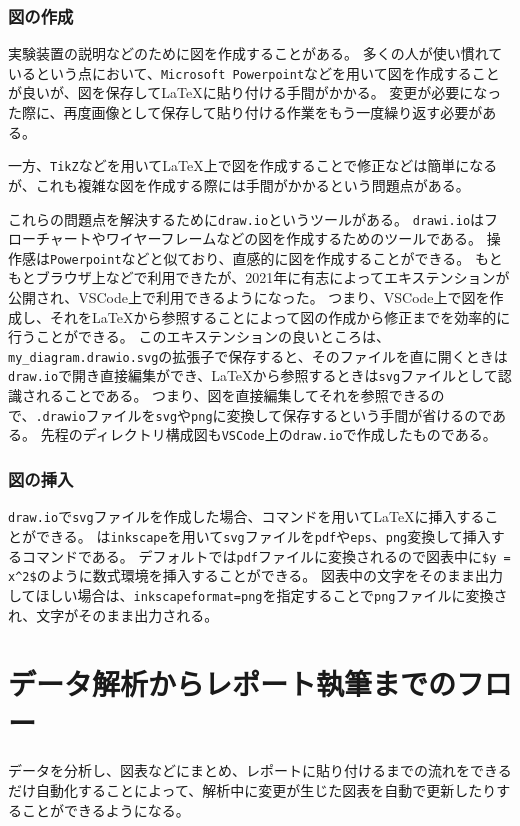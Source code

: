 \subsubsection{図の作成}

実験装置の説明などのために図を作成することがある。
多くの人が使い慣れているという点において、\verb|Microsoft Powerpoint|などを用いて図を作成することが良いが、図を保存して\LaTeX に貼り付ける手間がかかる。
変更が必要になった際に、再度画像として保存して貼り付ける作業をもう一度繰り返す必要がある。

一方、\verb|TikZ|などを用いて\LaTeX 上で図を作成することで修正などは簡単になるが、これも複雑な図を作成する際には手間がかかるという問題点がある。

これらの問題点を解決するために\verb|draw.io|というツールがある。
\verb|drawi.io|はフローチャートやワイヤーフレームなどの図を作成するためのツールである。
操作感は\verb|Powerpoint|などと似ており、直感的に図を作成することができる。
もともとブラウザ上などで利用できたが、2021年に有志によってエキステンションが公開され、VSCode上で利用できるようになった。
つまり、VSCode上で図を作成し、それを\LaTeX から参照することによって図の作成から修正までを効率的に行うことができる。
このエキステンションの良いところは、\verb|my_diagram.drawio.svg|の拡張子で保存すると、そのファイルを直に開くときは\verb|draw.io|で開き直接編集ができ、\LaTeX から参照するときは\verb|svg|ファイルとして認識されることである。
つまり、図を直接編集してそれを参照できるので、\verb|.drawio|ファイルを\verb|svg|や\verb|png|に変換して保存するという手間が省けるのである。
先程のディレクトリ構成図も\verb|VSCode|上の\verb|draw.io|で作成したものである。

\subsubsection{図の挿入}

\verb|draw.io|で\verb|svg|ファイルを作成した場合、\verb||コマンドを用いて\LaTeX に挿入することができる。
\verb||は\verb|inkscape|を用いて\verb|svg|ファイルを\verb|pdf|や\verb|eps|、\verb|png|変換して挿入するコマンドである。
デフォルトでは\verb|pdf|ファイルに変換されるので図表中に\verb|$y = x^2$|のように数式環境を挿入することができる。
図表中の文字をそのまま出力してほしい場合は、\verb|inkscapeformat=png|を指定することで\verb|png|ファイルに変換され、文字がそのまま出力される。

\section{データ解析からレポート執筆までのフロー}

データを分析し、図表などにまとめ、レポートに貼り付けるまでの流れをできるだけ自動化することによって、解析中に変更が生じた図表を自動で更新したりすることができるようになる。

